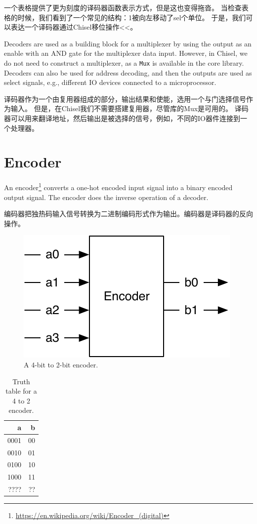 \documentclass[%
    10pt,
    headinclude, footexclude,
    openright, %
    notitlepage,
    cleardoubleempty,
    headsepline,
    pointlessnumbers,
    bibtotoc, idxtotoc,
    ]{scrbook}
\newcommand{\code}[1]{{\small{\texttt{#1}}}}
\newcommand{\scale}{0.7}
\newcommand{\myref}[2]{\href{#1}{#2}}
\renewcommand{\myref}[2]{{#2}{\footnote{\url{#1}}}}
\begin{document}
一个表格提供了更为刻度的译码器函数表示方式，但是这也变得拖沓。
当检查表格的时候，我们看到了一个常见的结构：1被向左移动了sel个单位。
于是，我们可以表达一个译码器通过Chisel移位操作<<。


Decoders are used as a building block for a multiplexer by using the output as an enable
with an AND gate for the multiplexer data input. However, in Chisel, we do not need to construct
a multiplexer, as a \code{Mux} is available in the core library.
Decoders can also be used for address decoding, and then the outputs are used as
select signals, e.g., different IO devices connected to a microprocessor. 

译码器作为一个由复用器组成的部分，输出结果和使能，选用一个与门选择信号作为输入。
但是，在Chisel我们不需要搭建复用器，尽管库的Mux是可用的。
译码器可以用来翻译地址，然后输出是被选择的信号，例如，不同的IO器件连接到一个处理器。


\section{Encoder}

An \myref{https://en.wikipedia.org/wiki/Encoder_(digital)}{encoder}
converts a one-hot encoded input signal into a binary encoded output signal.
The encoder does the inverse operation of a decoder.

编码器把独热码输入信号转换为二进制编码形式作为输出。编码器是译码器的反向操作。

\begin{figure}
  \centering
  \includegraphics[scale=\scale]{figures/encoder}
  \caption{A 4-bit to 2-bit encoder.}
  \label{fig:encoder}
\end{figure}


\begin{table}
 \centering
 \label{tab:encoder}
  \begin{tabular}{rr}
    \toprule
    a & b \\
    \midrule
    0001 & 00 \\
    0010 & 01 \\
    0100 & 10 \\
    1000 & 11 \\
    ???? & ?? \\
    \bottomrule 
  \end{tabular} 
  \caption{Truth table for a 4 to 2 encoder.}
\end{table}
\end{document}
